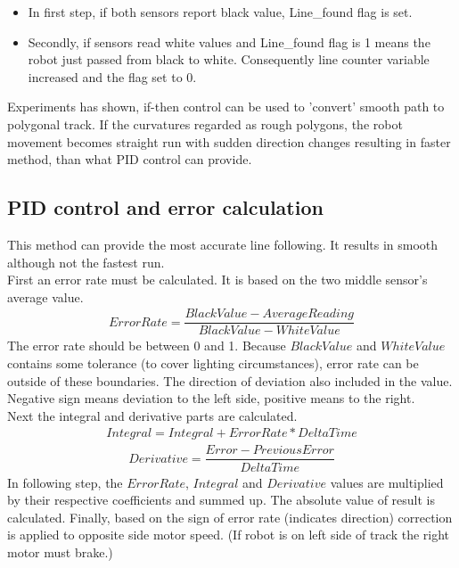 \documentclass[11pt,a4paper,oneside,article]{memoir}
\begin{document}
\begin{itemize}
	\item In first step, if both sensors report black value, Line\_found flag is set.
	\item Secondly, if sensors read white values and Line\_found flag is 1 means the robot just passed from black to white. Consequently line counter variable increased and the flag set to 0.
\end{itemize}
Experiments has shown, if-then control can be used to 'convert' smooth path to polygonal track. If the curvatures regarded as rough polygons, the robot movement becomes straight run with sudden direction changes resulting in faster method, than what PID control can provide.

\subsection{PID control and error calculation}
This method can provide the most accurate line following. It results in smooth although not the fastest run.\\
First an error rate must be calculated. It is based on the two middle sensor's average value.
\begin{align}
ErrorRate = \dfrac{BlackValue - AverageReading}{BlackValue - WhiteValue}
\end{align}
The error rate should be between 0 and 1. Because $BlackValue$ and $WhiteValue$ contains some tolerance (to cover lighting circumstances), error rate can be outside of these boundaries. The direction of deviation also included in the value. Negative sign means deviation to the left side, positive means to the right.\\
Next the integral and derivative parts are calculated.
\begin{align}
Integral = Integral + ErrorRate * DeltaTime
\end{align}
\begin{align}
Derivative = \dfrac{Error - PreviousError}{DeltaTime}
\end{align}
In following step, the $ErrorRate$, $Integral$ and $Derivative$ values are multiplied by their respective coefficients and summed up. The absolute value of result is calculated. Finally, based on the sign of error rate (indicates direction) correction is applied to opposite side motor speed. (If robot is on left side of track the right motor must brake.)
\end{document}
